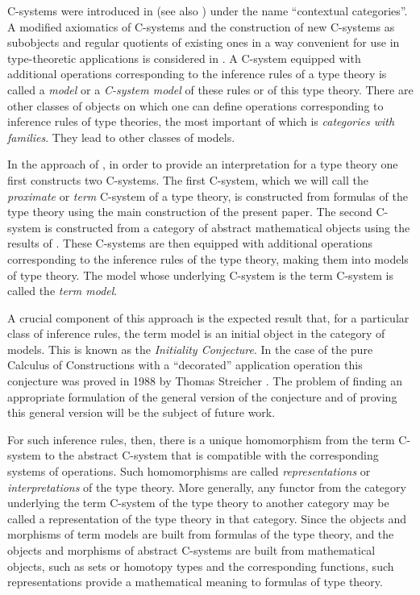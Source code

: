 \documentclass[onecolumn,12pt]{amsart}
\numberwithin{proposition}{subsection}
\begin{document}
C-systems were introduced in \cite{Cartmell0} (see also \cite{Cartmell1}) under
the name ``contextual categories''. A modified axiomatics of C-systems and the
construction of new C-systems as subobjects and regular quotients of 
existing ones in a way convenient for use in type-theoretic applications is
considered in \cite{Csubsystems}. A C-system equipped with additional
operations corresponding to the inference rules of a type theory is called a
{\em model} or a {\em C-system model} of these rules or of this type theory. There are
other classes of objects on which one can define operations corresponding to
inference rules of type theories, the most important of which is {\em categories with families}.
They lead to other classes of models.

In the approach of \cite{CMUtalk}, in order to provide an interpretation for a
type theory one first constructs two C-systems.  The first C-system, which we will
call the {\em proximate} or {\em term} C-system of a type theory, is constructed from
formulas of the type theory using the main construction of the present paper.
The second C-system is constructed from a category of abstract mathematical
objects using the results of \cite{Cfromauniverse}. These C-systems are then
equipped with additional operations corresponding to the inference rules of the
type theory, making them into models of type theory.  The model whose underlying
C-system is the term C-system is called the {\em term model}.

A crucial component of this approach is the expected result that, for a
particular class of inference rules, the term model is an initial object in the
category of models. This is known as the {\em Initiality Conjecture}. In the case of
the pure Calculus of Constructions with a ``decorated'' application operation
this conjecture was proved in 1988 by Thomas Streicher \cite{Streicher}. The
problem of finding an appropriate formulation of the general version of the
conjecture and of proving this general version will be the subject of future
work.

For such inference rules, then, there is a unique homomorphism from the term
C-system to the abstract C-system that is compatible with the corresponding
systems of operations. Such homomorphisms are called {\em representations} or
{\em interpretations} of the type theory. More generally, any functor from the
category underlying the term C-system of the type theory to another category
may be called a representation of the type theory in that category. Since
the objects and morphisms of term models are built from formulas of the type theory,
and the objects and morphisms of abstract C-systems are built from mathematical
objects, such as sets or homotopy types and the corresponding functions, such
representations provide a mathematical meaning to formulas of type theory.
\end{document}
